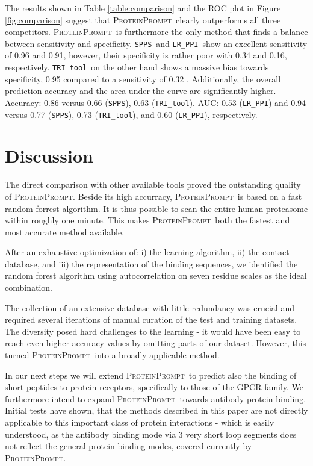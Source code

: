 \documentclass{bioinfo}
\newcommand{\spps}{\texttt{SPPS}}
\newcommand{\tri}{\texttt{TRI\_tool}}
\newcommand{\lr}{\texttt{LR\_PPI}}
\newcommand{\tool}{\textsc{ProteinPrompt}}
\begin{document}
The results shown in Table \ref{table:comparison} and the ROC plot in
Figure \ref{fig:comparison} suggest that \tool\  clearly outperforms all
three competitors. \tool\  is furthermore the only method that finds a
balance between sensitivity and specificity. \spps\ and \lr\ show an
excellent sensitivity of 0.96 and 0.91, however, their
specificity is rather poor with 0.34 and 0.16, respectively. \tri\ on
the other hand shows a massive bias towards specificity, 0.95 compared
to a sensitivity of 0.32 .
Additionally, the overall prediction accuracy and the area under the curve are significantly higher.
Accuracy: 0.86 versus 0.66 (\spps), 0.63 (\tri).
AUC: 0.53 (\lr) and 0.94 versus 0.77 (\spps), 0.73 (\tri), and 0.60 (\lr), respectively.


\section{Discussion}

The direct comparison with other available tools
proved the outstanding quality of \tool.
Beside its high accurracy, \tool\ is based on a fast random forrest algorithm.
It is thus possible to scan the entire human proteasome within roughly one minute.
This makes \tool\  both the fastest and most accurate method available. 

After an exhaustive optimization of: i) the learning algorithm, ii)
the contact database, and iii) the representation of the binding
sequences, we identified the random forest algorithm using autocorrelation on seven
residue scales as the ideal combination.

The collection of an extensive database with little redundancy was crucial
and required several iterations of manual curation of the test and training datasets.
The diversity posed hard challenges to the learning
- it would have been easy to reach even higher accuracy values by omitting parts of our dataset.
However, this turned \tool\ into a broadly applicable method.

In our next steps we will extend \tool\  to predict also the binding of short peptides to protein receptors, specifically to those of the GPCR family.
We furthermore intend to expand \tool\  towards antibody-protein binding.
Initial tests have shown, that the methods described in this paper are not directly applicable to this important class of protein interactions - which is easily understood, as the antibody binding mode via 3 very short loop segments does not reflect the general protein binding modes, covered currently by \tool. 
\end{document}
